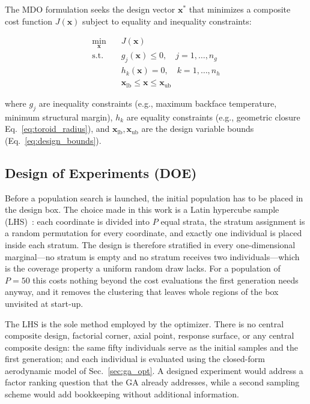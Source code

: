 \noindent The MDO formulation seeks the design vector $\mathbf{x}^*$ that minimizes a composite cost function $J(\mathbf{x})$ subject to equality and inequality constraints:

\begin{equation}
    \begin{aligned}
        \min_{\mathbf{x}} \quad & J(\mathbf{x}) \\
        \text{s.t.} \quad & g_j(\mathbf{x}) \leq 0, \quad j = 1, \ldots, n_g \\
        & h_k(\mathbf{x}) = 0, \quad k = 1, \ldots, n_h \\
        & \mathbf{x}_{\text{lb}} \leq \mathbf{x} \leq \mathbf{x}_{\text{ub}}
    \end{aligned}
    \label{eq:mdo_formulation}
\end{equation}

\noindent where $g_j$ are inequality constraints (e.g., maximum backface temperature, minimum structural margin), $h_k$ are equality constraints (e.g., geometric closure Eq.~\ref{eq:toroid_radius}), and $\mathbf{x}_{\text{lb}}, \mathbf{x}_{\text{ub}}$ are the design variable bounds (Eq.~\ref{eq:design_bounds}).

\subsection{Design of Experiments (DOE)}

Before a population search is launched, the initial population has to be placed in the design box. The choice made in this work is a Latin hypercube sample (LHS)~\cite{mckay1979lhs}: each coordinate is divided into $P$ equal strata, the stratum assignment is a random permutation for every coordinate, and exactly one individual is placed inside each stratum. The design is therefore stratified in every one-dimensional marginal---no stratum is empty and no stratum receives two individuals---which is the coverage property a uniform random draw lacks. For a population of $P=50$ this costs nothing beyond the cost evaluations the first generation needs anyway, and it removes the clustering that leaves whole regions of the box unvisited at start-up.

The LHS is the sole method employed by the optimizer. There is no central composite design, factorial corner, axial point, response surface, or any central composite design: the same fifty individuals serve as the initial samples and the first generation; and each individual is evaluated using the closed-form aerodynamic model of Sec.~\ref{sec:ga_opt}. A designed experiment would address a factor ranking question that the GA already addresses, while a second sampling scheme would add bookkeeping without additional information.

